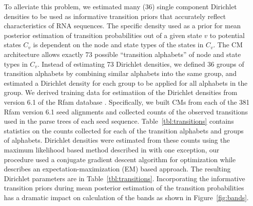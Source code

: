 \documentclass[11pt]{article}
\begin{document}
To alleviate this problem, we estimated many (36) single component Dirichlet
densities to be used as informative transition priors that accurately
reflect characteristics of RNA sequences. The specific density used as
a prior for mean posterior estimation of transition probabilities out
of a given state $v$ to potential states $C_v$ is dependent on the node and
state types of the states in $C_v$. The CM architecture allows exactly
73 possible ``transition alphabets'' of node and state types in
$C_v$. Instead of estimating 73 Dirichlet densities, we defined 36
groups of transition alphabets by combining similar alphabets into the
same group, and estimated a Dirichlet density for each group to be
applied for all alphabets in the group. We derived training data for
estimatiion of the Dirichlet densities from version 6.1 of the Rfam
database \cite{Griffiths-Jones05}.
Specifically, we built CMs from each of the 381 Rfam version 6.1 seed
alignments and collected counts of the
observed transitions used in the parse trees of each seed sequence.
Table~\ref{tbl:transitions} contains statistics on the counts collected
for each of the transition alphabets and groups of alphabets.
Dirichlet densities were estimated from these counts using the maximum
likelihood based method described in \cite{Sjolander96} with one
exception, our procedure used a conjugate gradient descent algorithm
\cite{Press93} for optimization while \cite{Sjolander96} describes an
expectation-maximization (EM) based approach.  The resulting Dirichlet
parameters are in Table~\ref{tbl:transitions}.  
Incorporating the informative transition priors during mean posterior
estimation of the transition probabilities has a dramatic impact
on calculation of the bands as shown in Figure~\ref{fig:bands}.
\end{document}

